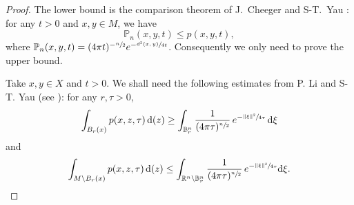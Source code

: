 \documentclass[JEP,XML,SOM,Unicode,published]{cedram}
\newcommand{\NoChangel}[1]{%
\expandafter\let\csname old\string#1\endcsname=#1
\let#1=\relax
\newcommand{#1}{\mathcode`l="716C\csname old\string#1\endcsname\mathcode`l="7160 }%
}
\theoremstyle{plain}
\theoremstyle{definition}
\newcommand{\setR}{\mathbb{R}}
\newcommand{\bP}{\mathbb{P}}
\newcommand{\di}{\mathop{}\!\mathrm{d}}
\DeclareMathOperator{\vol}{vol}\NoChangel{\vol}
\begin{document}
\begin{proof}
The lower bound is the comparison theorem of J.~Cheeger and S-T.~Yau \cite{CheegerYau}: for any $t>0$ and $x,y\in M$, we have
\begin{equation}\label{eq:CheegerYau}\bP_n(x,y,t)\le p(x,y,t),\end{equation}
where
$\bP_n(x,y,t)=(4\pi t)^{-\sfrac n2}e^{-\sfrac{d^2(x,y)}{4t}}$. Consequently we only need to prove the upper bound.

Take $x,y \in X$ and $t>0$. We shall need the following estimates from P. Li and S-T. Yau (see \cite[Form.\,(2.1)]{LiTamWang}): for any $r,\tau>0$,
\begin{equation}\label{eq:LY1}\int_{B_r(x)}p(x,z,\tau)\di\vol(z)\ge \int_{\mathbb{B}^n_r}\frac{1}{(4\pi \tau)^{\sfrac n2}}\,e^{-\sfrac{\|\xi\|^2}{4\tau}}\di \xi
\end{equation}
and
\begin{equation}\label{eq:LY2}
\int_{M\setminus B_r(x)}p(x,z,\tau)\di \vol(z)\le \int_{\setR^n\setminus \mathbb{B}_r^n}\frac{1}{(4\pi \tau)^{\sfrac n2}}\,e^{-\sfrac{\|\xi\|^2}{4\tau}}\mathrm{\di}\xi.
\end{equation}


\end{proof}
\end{document}
